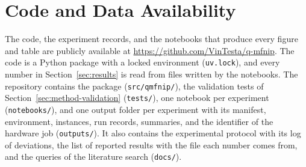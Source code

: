 \section*{Code and Data Availability}
The code, the experiment records, and the notebooks that produce every figure and table are publicly available at \url{https://github.com/VinTesta/q-mfnip}. The code is a Python package with a locked environment (\texttt{uv.lock}), and every number in Section~\ref{sec:results} is read from files written by the notebooks. The repository contains the package (\texttt{src/qmfnip/}), the validation tests of Section~\ref{sec:method-validation} (\texttt{tests/}), one notebook per experiment (\texttt{notebooks/}), and one output folder per experiment with its manifest, environment, instances, run records, summaries, and the identifier of the hardware job (\texttt{outputs/}). It also contains the experimental protocol with its log of deviations, the list of reported results with the file each number comes from, and the queries of the literature search (\texttt{docs/}).
